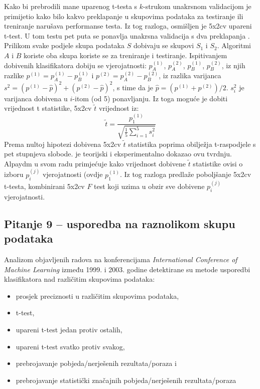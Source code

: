Kako bi prebrodili mane uparenog t-testa s $k$-strukom unakrsnom validacijom \citep{dietterich1998approximate} je primijetio kako bilo kakvo preklapanje u skupovima podataka za testiranje ili treniranje narušava performanse testa. Iz tog razloga, osmišljen je 5x2cv upareni t-test. U tom testu pet puta se ponavlja unakrsna validacija s dva preklapanja . Prilikom svake podjele skupa podataka $S$ dobivaju se skupovi $S_1$ i $S_2$. Algoritmi $A$ i $B$ koriste oba skupa koriste se za treniranje i testiranje. Ispitivanjem dobivenih klasifikatora dobiju se vjerojatnosti: $p_{A}^{(1)}$, $p_{A}^{(2)}$, $p_{B}^{(1)}$, $p_{B}^{(2)}$, iz njih razlike $p^{(1)}=p_{A}^{(1)}-p_{B}^{(1)}$ i $p^{(2)}=p_{A}^{(2)}-p_{B}^{(2)}$, iz razlika varijanca $s^2=(p^{(1)}-\hat{p})^2+(p^{(2)} - \hat{p})^2$, s time da je $\hat{p} = (p^{(1)}+p^{(2)})/2$. $s_{i}^{2}$ je varijanca dobivena u $i$-itom (od 5) ponavljanju. Iz toga moguće je dobiti vrijednost t statistike, 5x2cv $\tilde{t}$ vrijednost iz:
\begin{equation}
\tilde{t} = \frac{p_{1}^{(1)}}{\sqrt{\frac{1}{5}\sum_{i=1}^{5}s_{i}^{2}}}
\end{equation}
Prema nultoj hipotezi dobivena 5x2cv $\tilde{t}$ statistika poprima obilježja t-raspodjele s pet stupnjeva slobode. \citep{dietterich1998approximate} je teorijski i eksperimentalno dokazao ovu tvrdnju. Alpaydm u svom radu \citep{alpaydm1999combined}  primjećuje kako vrijednost dobivene $\tilde{t}$ statistike ovisi o izboru $p_{i}^{(j)}$ vjerojatnosti (ovdje $p_{1}^{(1)}$. Iz tog razloga predlaže poboljšanje 5x2cv t-testa, kombinirani 5x2cv $F$ test koji uzima u obzir sve dobivene $p_{i}^{(j)}$ vjerojatnosti. 

\subsection{Pitanje 9 -- usporedba na raznolikom skupu podataka}
\label{subsec:couting}

Analizom objavljenih radova na konferencijama \textit{International Conference of Machine Learning} između 1999. i 2003. godine \citep{demvsar2006statistical} detektirane su metode usporedbi klasifikatora nad različitim skupovima podataka:
\begin{itemize}
\item prosjek preciznosti u različitim skupovima podataka,
\item t-test,
\item upareni t-test jedan protiv ostalih,
\item upareni t-test svatko protiv svakog,
\item prebrojavanje pobjeda/nerješenih rezultata/poraza i
\item prebrojavanje statistički značajnih pobjeda/nerješenih rezultata/poraza
\end{itemize}


